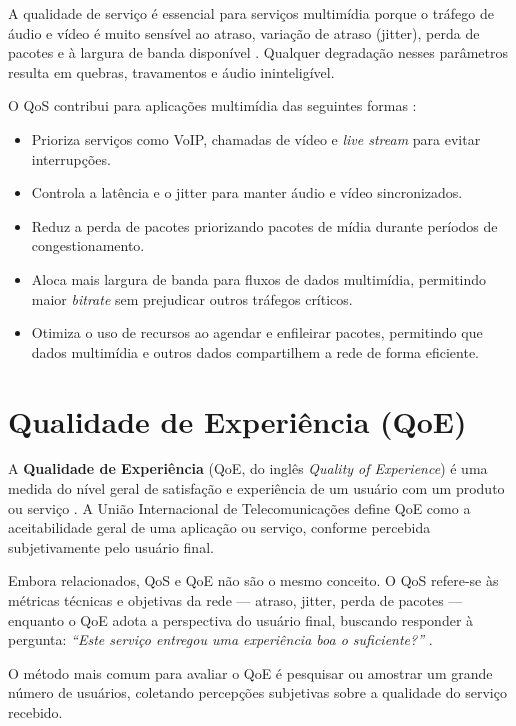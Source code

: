A qualidade de serviço é essencial para serviços multimídia porque o tráfego de
áudio e vídeo é muito sensível ao atraso, variação de atraso (jitter), perda de
pacotes e à largura de banda disponível \cite{geeksforgeeks2024}. Qualquer
degradação nesses parâmetros resulta em quebras, travamentos e áudio
ininteligível.

O QoS contribui para aplicações multimídia das seguintes formas
\cite{fortinet2024,geeksforgeeks2024}:

\begin{itemize}
  \item Prioriza serviços como VoIP, chamadas de vídeo e \textit{live stream}
  para evitar interrupções.
  \item Controla a latência e o jitter para manter áudio e vídeo sincronizados.
  \item Reduz a perda de pacotes priorizando pacotes de mídia durante períodos de
  congestionamento.
  \item Aloca mais largura de banda para fluxos de dados multimídia, permitindo
  maior \textit{bitrate} sem prejudicar outros tráfegos críticos.
  \item Otimiza o uso de recursos ao agendar e enfileirar pacotes, permitindo que
  dados multimídia e outros dados compartilhem a rede de forma eficiente.
\end{itemize}

\section{Qualidade de Experiência (QoE)}

A \textbf{Qualidade de Experiência} (QoE, do inglês \textit{Quality of
Experience}) é uma medida do nível geral de satisfação e experiência de um
usuário com um produto ou serviço \cite{techtargetqoe2024}. A União Internacional
de Telecomunicações define QoE como a aceitabilidade geral de uma aplicação ou
serviço, conforme percebida subjetivamente pelo usuário final.

Embora relacionados, QoS e QoE não são o mesmo conceito. O QoS refere-se às
métricas técnicas e objetivas da rede — atraso, jitter, perda de pacotes —
enquanto o QoE adota a perspectiva do usuário final, buscando responder à
pergunta: \textit{``Este serviço entregou uma experiência boa o suficiente?''}
\cite{techtargetqoe2024}.

O método mais comum para avaliar o QoE é pesquisar ou amostrar um grande número
de usuários, coletando percepções subjetivas sobre a qualidade do serviço
recebido.

